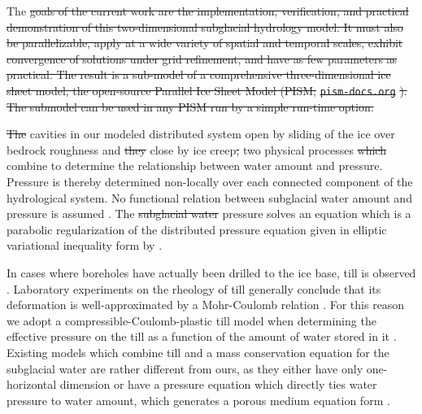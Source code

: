 \documentclass[gmd]{copernicus}   %
\providecommand{\DIFadd}[1]{{\protect\color{blue}\uwave{#1}}} %
\providecommand{\DIFdel}[1]{{\protect\color{red}\sout{#1}}}                      %
\providecommand{\DIFaddbegin}{} %
\providecommand{\DIFaddend}{} %
\providecommand{\DIFdelbegin}{} %
\providecommand{\DIFdelend}{} %
\begin{document}
The \DIFdelbegin \DIFdel{goals of the current work are the implementation, verification, and practical demonstration of this two-dimensional subglacial hydrology model.  It must also be parallelizable, apply at a wide variety of spatial and temporal scales, exhibit convergence of solutions under grid refinement, and have as few parameters as practical.  The result is a sub-model of a comprehensive three-dimensional ice sheet model, the open-source Parallel Ice Sheet Model (PISM; }\texttt{\DIFdel{pism-docs.org}}%
\DIFdel{).  The submodel can be used in any PISM run by a simple run-time option.
}%

\DIFdel{The }\DIFdelend cavities in our modeled distributed system open by sliding of the ice over bedrock roughness and \DIFdelbegin \DIFdel{they }\DIFdelend close by ice creep\DIFdelbegin \DIFdel{, }\DIFdelend \DIFaddbegin \DIFadd{.  These }\DIFaddend two physical processes \DIFdelbegin \DIFdel{which }\DIFdelend combine to determine the relationship between water amount and pressure.  Pressure is thereby determined non-locally over each connected component of the hydrological system.  No functional relation between subglacial water amount and pressure is assumed \citep[compare][]{FlowersClarke2002_theory}.  The \DIFdelbegin \DIFdel{subglacial water }\DIFdelend pressure solves an equation which is a parabolic regularization of the distributed pressure equation given in elliptic variational inequality form by \cite{Schoofetal2012}.

In cases where boreholes have actually been drilled to the ice base, till is \DIFaddbegin \DIFadd{often }\DIFaddend observed \citep{Hookeetal1997,Tulaczyketal2000,TrufferHarrisonEchelmeyer2000,TrufferHarrison2006}.  Laboratory experiments on the rheology of till \citep{Kamb1991,Hookeetal1997,Tulaczyketal2000,TrufferEchelmeyerHarrison2001} generally conclude that its deformation is well-approximated by a Mohr-Coulomb relation \citep{SchoofTill}.  For this reason we adopt a compressible-Coulomb-plastic till model when determining the effective pressure on the till as a function of the amount of water stored in it \citep{Tulaczyketal2000}.  Existing models which combine till and a mass conservation equation for the subglacial water are rather different from ours, as they either have only one-horizontal dimension \citep{vanderWeletal2013} or have a pressure equation which directly ties water pressure to water amount, which generates a porous medium equation form \citep{FlowersClarke2002_theory,deFleurianetal2014}.
\end{document}
